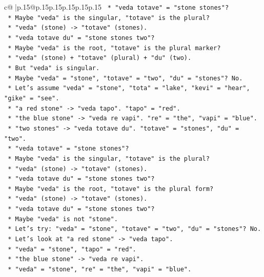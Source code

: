 \documentclass{article}
\begin{document}
{\begin{supertabular}{c@{$\;$}|p{.15\linewidth}@{}p{.15\linewidth}p{.15\linewidth}p{.15\linewidth}p{.15\linewidth}p{.15\linewidth}}
{{{\texttt{    *   "veda totave" = "stone stones"?} \\
\texttt{    *   Maybe "veda" is the singular, "totave" is the plural?} \\
\texttt{    *   "veda" (stone) {-}> "totave" (stones).} \\
\texttt{    *   "veda totave du" = "stone stones two"?} \\
\texttt{    *   Maybe "veda" is the root, "totave" is the plural marker?} \\
\texttt{    *   "veda" (stone) + "totave" (plural) + "du" (two).} \\
\texttt{    *   But "veda" is singular.} \\
\texttt{    *   Maybe "veda" = "stone", "totave" = "two", "du" = "stones"? No.} \\
\texttt{    *   Let's assume "veda" = "stone", "tota" = "lake", "kevi" = "hear", "gike" = "see".} \\
\texttt{    *   "a red stone" {-}> "veda tapo". "tapo" = "red".} \\
\texttt{    *   "the blue stone" {-}> "veda re vapi". "re" = "the", "vapi" = "blue".} \\
\texttt{    *   "two stones" {-}> "veda totave du". "totave" = "stones", "du" = "two".} \\
\texttt{    *   "veda totave" = "stone stones"?} \\
\texttt{    *   Maybe "veda" is the singular, "totave" is the plural?} \\
\texttt{    *   "veda" (stone) {-}> "totave" (stones).} \\
\texttt{    *   "veda totave du" = "stone stones two"?} \\
\texttt{    *   Maybe "veda" is the root, "totave" is the plural form?} \\
\texttt{    *   "veda" (stone) {-}> "totave" (stones).} \\
\texttt{    *   "veda totave du" = "stone stones two"?} \\
\texttt{    *   Maybe "veda" is not "stone".} \\
\texttt{    *   Let's try: "veda" = "stone", "totave" = "two", "du" = "stones"? No.} \\
\texttt{    *   Let's look at "a red stone" {-}> "veda tapo".} \\
\texttt{    *   "veda" = "stone", "tapo" = "red".} \\
\texttt{    *   "the blue stone" {-}> "veda re vapi".} \\
\texttt{    *   "veda" = "stone", "re" = "the", "vapi" = "blue".} \\
}}}
\end{supertabular}}
\end{document}
